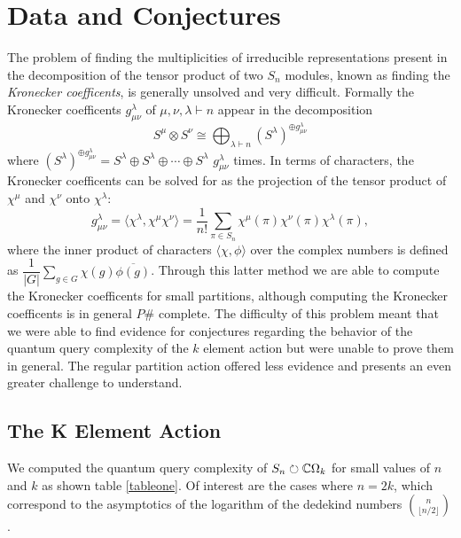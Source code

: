 \documentclass[12pt,twoside]{reedthesis}
\theoremstyle{plain}   %
\theoremstyle{definition}
\theoremstyle{remark}
\numberwithin{equation}{section}
\def\acts{\circlearrowright} %
\begin{document}
  \section{Data and Conjectures}
  The problem of finding the multiplicities of irreducible representations present in the decomposition of the tensor product of two $S_n$ modules, known as finding the \emph{Kronecker coefficents},
  is generally unsolved and very difficult. Formally the Kronecker coefficents $g^\lambda_{\mu \nu}$ of $\mu, \nu, \lambda \vdash n$ appear in the decomposition
  \[ S^\mu \otimes S^\nu \cong \bigoplus_{\lambda \vdash n}  (S^\lambda)^{\oplus g^\lambda_{\mu \nu}}\]
  where $(S^\lambda)^{\oplus g^\lambda_{\mu \nu}} = S^\lambda \oplus S^\lambda \oplus \cdots \oplus S^\lambda $ $g^\lambda_{\mu \nu}$ times.
  In terms of characters, the Kronecker coefficents can be solved for as the projection of the tensor product of $\chi^\mu$ and $\chi^\nu$ onto $\chi^\lambda$:
  \[ g^\lambda_{\mu \nu} = \langle \chi^{\lambda} , \chi^\mu \chi^{\nu} \rangle = \dfrac{1}{n!} \sum_{\pi \in S_n} \chi^\mu(\pi) \chi^\nu(\pi) \chi^\lambda (\pi),\]
  where the inner product of characters $\langle \chi, \phi \rangle$ over the complex numbers is defined as $\dfrac{1}{|G|} \sum_{g \in G} \chi(g) \overline{\phi(g)}$.
  Through this latter method we are able to compute the Kronecker coefficents for small partitions, although computing the Kronecker coefficents is in general $P\#$ complete.
  The difficulty of this problem meant that we were able to find evidence for conjectures regarding the behavior of the quantum query complexity of the $k$ element action but were unable to prove them in general.
  The regular partition action offered less evidence and presents an even greater challenge to understand.
  \subsection{The K Element Action}
  We computed the quantum query complexity of $S_n \acts \CC \Omega_k$ for small values of $n$ and $k$ as shown table \ref{tableone}. Of interest are the cases where $n = 2k$, which correspond to the
  asymptotics of the logarithm of the dedekind numbers $\binom{n}{\lfloor{n/2} \rfloor}$.
\end{document}
